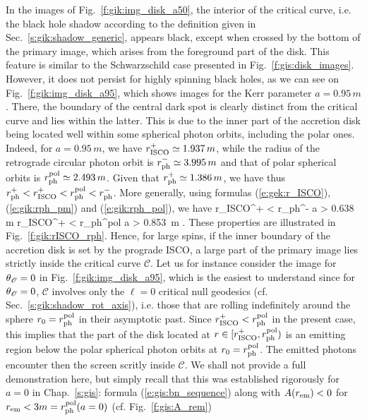 In the images of Fig.~\ref{f:gik:img_disk_a50}, the interior of the critical
curve, i.e. the black hole shadow according to the definition given in Sec.~\ref{s:gik:shadow_generic}, appears black, except when crossed by the bottom of the primary
image, which arises from the foreground part of the disk. This feature is similar
to the Schwarzschild case presented in Fig.~\ref{f:gis:disk_images}.
However, it does not persist for highly spinning black holes, as we can see
on Fig.~\ref{f:gik:img_disk_a95}, which shows images for the
Kerr parameter $a = 0.95\, m$.
There, the boundary of the central dark spot is clearly distinct from
the critical curve and lies within the latter.
This is due to the inner part of the accretion disk being located
well within some spherical photon orbits, including the polar ones. Indeed, for $a=0.95\, m$,
we have $r_{\rm ISCO}^+ \simeq 1.937\, m$, while
the radius of the retrograde circular photon orbit is $r_{\rm ph}^-\simeq 3.995\, m$
and that of polar spherical orbits is $r_{\rm ph}^{\rm pol} \simeq 2.493\, m$.
Given that $r_{\rm ph}^+\simeq 1.386\, m$, we have thus
$r_{\rm ph}^+ < r_{\rm ISCO}^+ < r_{\rm ph}^{\rm pol} < r_{\rm ph}^-$.
More generally, using formulas (\ref{e:gek:r_ISCO}), (\ref{e:gik:rph_pm}) and (\ref{e:gik:rph_pol}),
we have
\be
    r_{\rm ISCO}^+ < r_{\rm ph}^-  \iff a > 0.638\, m
    \qand
    r_{\rm ISCO}^+ < r_{\rm ph}^{\rm pol} \iff a > 0.853\, m .
\ee
These properties are illustrated in  Fig.~\ref{f:gik:rISCO_rph}.
Hence, for large spins, if the inner boundary of the accretion disk is set by the prograde ISCO,
a large part of the primary image lies strictly inside the critical curve $\mathscr{C}$.
Let us for instance consider the image for $\theta_{\mathscr{O}}=0$ in Fig.~\ref{f:gik:img_disk_a95}, which
is the easiest to understand since for $\theta_{\mathscr{O}}=0$, $\mathscr{C}$ involves only the $\ell=0$ critical null geodesics (cf. Sec.~\ref{s:gik:shadow_rot_axis}), i.e. those that are rolling indefinitely around the sphere $r_0 = r_{\rm ph}^{\rm pol}$
in their asymptotic past. Since $r_{\rm ISCO}^+ < r_{\rm ph}^{\rm pol}$ in the present case, this implies that the part of the disk located at
$r\in [r_{\rm ISCO}^+, r_{\rm ph}^{\rm pol})$ %
is an emitting region below the polar spherical photon orbits at $r_0 = r_{\rm ph}^{\rm pol}$.
The emitted photons encounter then the screen scritly inside $\mathscr{C}$. We shall
not provide a full demonstration here, but simply recall that this was established rigorously
for $a=0$ in Chap.~\ref{s:gis}: formula (\ref{e:gis:bn_sequence}) along with
$A(r_{\rm em}) < 0$ for $r_{\rm em} < 3 m = r_{\rm ph}^{\rm pol}(a=0)$ (cf. Fig.~\ref{f:gis:A_rem})
